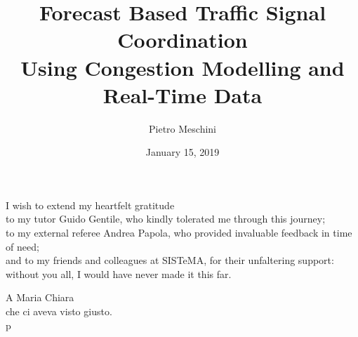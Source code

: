 \documentclass[11pt,a4paper,twoside]{book}
\author{Pietro Meschini}
\title{Forecast Based Traffic Signal Coordination\\ Using Congestion Modelling and Real-Time Data}
\date{January 15, 2019}
\begin{document}
\frontmatter
\maketitle

\begin{dedica}
	I wish to extend my heartfelt gratitude\\
	to my tutor Guido Gentile, who kindly tolerated me through this journey;\\
	to my external referee Andrea Papola, who provided invaluable feedback in time of need;\\
	and to my friends and colleagues at SISTeMA, for their unfaltering support:\\
	without you all, I would have never made it this far.
    \par   %
    \vspace{2\baselineskip}
    \Large
	A Maria Chiara\\
	che ci aveva visto giusto.\\
    \vspace{\baselineskip}
    p
  \end{dedica}



\tableofcontents



\mainmatter




 






%

%





\nocite{*}



\appendix

\end{document}
